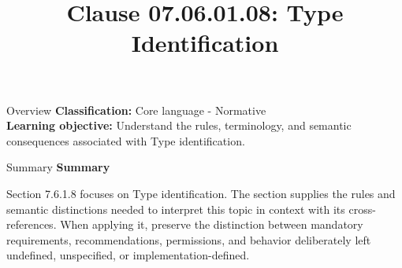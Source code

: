 \documentclass[10pt,letterpaper]{article}
\title{Clause 07.06.01.08: Type Identification}
\author{}
\date{}
\begin{document}
\maketitle
\begin{CornellOverviewBox}{Overview}
\textbf{Classification:} Core language - Normative\\[2pt]
\textbf{Learning objective:} Understand the rules, terminology, and semantic consequences associated with Type identification.
\end{CornellOverviewBox}\begin{CornellSummaryBox}{Summary}
{\sffamily\bfseries\color{Accent} Summary}\par\vspace{3pt}Section 7.6.1.8 focuses on Type identification. The section supplies the rules and semantic distinctions needed to interpret this topic in context with its cross-references. When applying it, preserve the distinction between mandatory requirements, recommendations, permissions, and behavior deliberately left undefined, unspecified, or implementation-defined.
\end{CornellSummaryBox}
\end{document}
